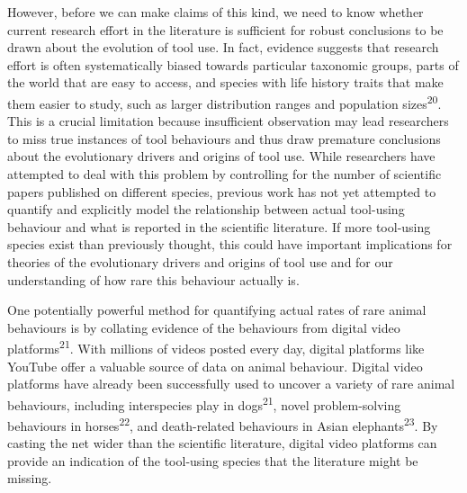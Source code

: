 \documentclass[
  man, donotrepeattitle,floatsintext]{apa6}
\begin{document}
However, before we can make claims of this kind, we need to know whether current
research effort in the literature is sufficient for robust conclusions to be
drawn about the evolution of tool use. In fact, evidence suggests that research
effort is often systematically biased towards particular taxonomic groups, parts
of the world that are easy to access, and species with life history traits that
make them easier to study, such as larger distribution ranges and population
sizes\textsuperscript{20}. This is a crucial limitation because insufficient
observation may lead researchers to miss true instances of tool behaviours and
thus draw premature conclusions about the evolutionary drivers and origins of
tool use. While researchers have attempted to deal with this problem by
controlling for the number of scientific papers published on different species,
previous work has not yet attempted to quantify and explicitly model the
relationship between actual tool-using behaviour and what is reported in the
scientific literature. If more tool-using species exist than previously thought,
this could have important implications for theories of the evolutionary drivers
and origins of tool use and for our understanding of how rare this behaviour
actually is.

One potentially powerful method for quantifying actual rates of rare animal
behaviours is by collating evidence of the behaviours from digital video
platforms\textsuperscript{21}. With millions of videos posted every day, digital
platforms like YouTube offer a valuable source of data on animal behaviour.
Digital video platforms have already been successfully used to uncover a variety
of rare animal behaviours, including interspecies play in dogs\textsuperscript{21},
novel problem-solving behaviours in horses\textsuperscript{22}, and death-related
behaviours in Asian elephants\textsuperscript{23}. By casting the net wider than the
scientific literature, digital video platforms can provide an indication of the
tool-using species that the literature might be missing.
\end{document}
